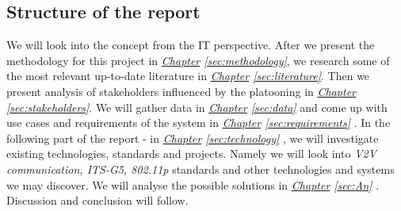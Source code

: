 \subsection{Structure of the report}
We will look into the concept from the IT perspective. After we present the methodology for this project in 
\textit{\hyperref[sec:methodology]{Chapter} \ref{sec:methodology}},
we research some of the most relevant up-to-date literature in 
\textit{\hyperref[sec:literature]{Chapter} \ref{sec:literature}}. 
Then we present analysis of stakeholders influenced by the platooning in 
\textit{\hyperref[sec:stakeholders]{Chapter} \ref{sec:stakeholders}}.
We will gather data in
\textit{\hyperref[sec:data]{Chapter} \ref{sec:data}}
and come up with use cases and requirements of the system in 
\textit{\hyperref[sec:requirements]{Chapter} \ref{sec:requirements}}
. In the following part of the report - in 
\textit{\hyperref[sec:technology]{Chapter} \ref{sec:technology}}
, we will investigate existing technologies, standards and projects. Namely we will look into \emph{V2V communication, ITS-G5, 802.11p} standards and other technologies and systems we may discover. We will analyse the possible solutions in 
\textit{\hyperref[sec:Analysis]{Chapter} \ref{sec:An}}
. Discussion and conclusion will follow.
% 
% 

